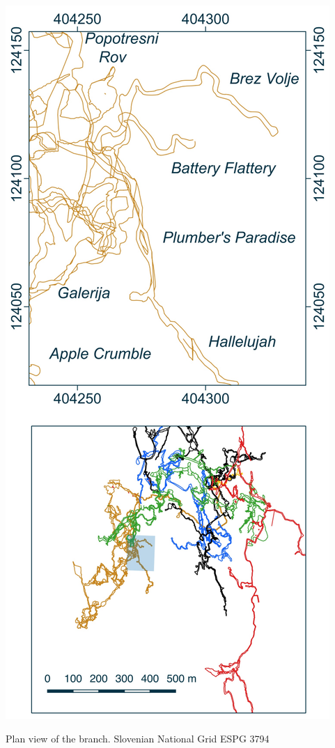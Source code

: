  \begin{marginsurvey}
\checkoddpage \ifoddpage \forcerectofloat \else \forceversofloat \fi
\centering
 \includegraphics[width=\linewidth]{images/little_insets/hallelujah_inset.pdf}
 \caption[Fenestrator branch]{Plan view of the \protect{} branch. Slovenian National Grid ESPG 3794}
 \label{halleujah inset}
\end{marginsurvey}

